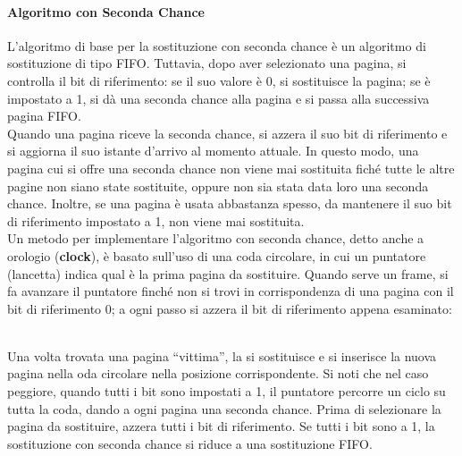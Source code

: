 \documentclass{article}
\begin{document}
				\paragraph{Algoritmo con Seconda Chance\\}
					L’algoritmo di base per la sostituzione con seconda chance è un algoritmo di sostituzione di tipo FIFO. Tuttavia, dopo aver selezionato una pagina, si controlla il bit di riferimento: se il suo valore è 0, si sostituisce la pagina; se è impostato a 1, si dà una seconda chance alla pagina e si passa alla successiva pagina FIFO.
					\\Quando una pagina riceve la seconda chance, si azzera il suo bit di riferimento e si aggiorna il suo istante d’arrivo al momento attuale. In questo modo, una pagina cui si offre una seconda chance non viene mai sostituita fiché tutte le altre pagine non siano state sostituite, oppure non sia stata data loro una seconda chance. Inoltre, se una pagina è usata abbastanza spesso, da mantenere il suo bit di riferimento impostato a 1, non viene mai sostituita.
					\\Un metodo per implementare l’algoritmo con seconda chance, detto anche a orologio (\textbf{clock}), è basato sull’uso di una coda circolare, in cui un puntatore (lancetta) indica qual è la prima pagina da sostituire. Quando serve un frame, si fa avanzare il puntatore finché non si trovi in corrispondenza di una pagina con il bit di riferimento 0; a ogni passo si azzera il bit di riferimento appena esaminato:
					\begin{figure}[ht!]
					\end{figure}
					\\Una volta trovata una pagina “vittima”, la si sostituisce e si inserisce la nuova pagina nella oda circolare nella posizione corrispondente. Si noti che nel caso peggiore, quando tutti i bit sono impostati a 1, il puntatore percorre un ciclo su tutta la coda, dando a ogni pagina una seconda chance. Prima di selezionare la pagina da sostituire, azzera tutti i bit di riferimento. Se tutti i bit sono a 1, la sostituzione con seconda chance si riduce a una sostituzione FIFO.
			
\end{document}
